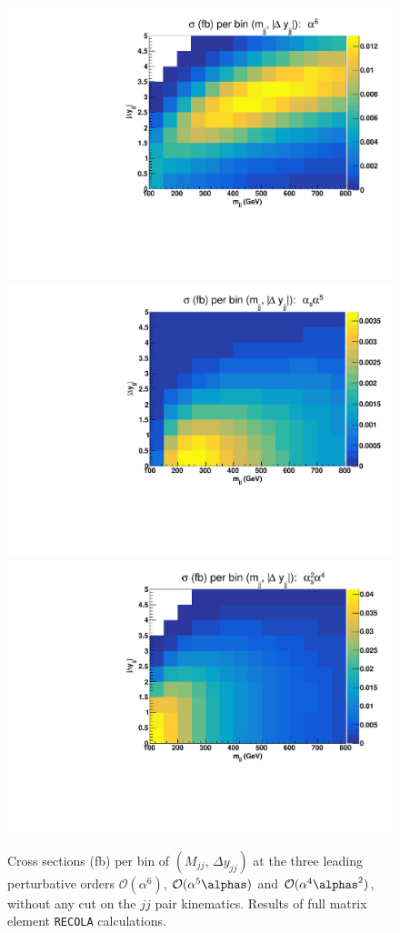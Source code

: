 \begin{figure}[ht]
\centering
\includegraphics[scale=0.395]{figures/scanfigures/scan_ew6.pdf}
\includegraphics[scale=0.395]{figures/scanfigures/scan_ew5qcd1.pdf}
\includegraphics[scale=0.395]{figures/scanfigures/scan_ew4qcd2.pdf}
\caption{Cross sections (fb) per bin of $(M_{jj},\,\Delta y_{jj})$ at the three leading perturbative orders $\mathcal{O}(\alpha^6)$, $\mathcal{O}(\alpha^5\alphas)$ and $\mathcal{O}(\alpha^4 \alphas^2)$, without any cut on the $jj$ pair kinematics. Results of full matrix element \texttt{RECOLA} calculations.}\label{fig:mjjdyjj_2d_LO}
\end{figure}

